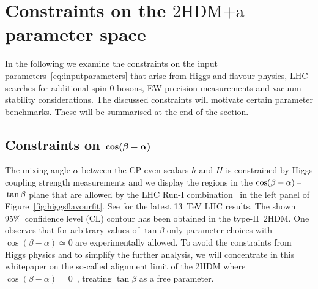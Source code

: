 \documentclass[a4paper, 11pt,notoc]{article}
\newcommand{\hdma}{\ensuremath{\textrm{2HDM+a}}\xspace}
\def\bm#1{\mbox{\boldmath$#1$\unboldmath}}
\begin{document}

\section{Constraints on the \hdma parameter space}
\label{sec:constraints}

In the following we examine the constraints on the input parameters~\eqref{eq:inputparameters} that arise from Higgs and flavour physics, LHC searches for additional spin-0 bosons, EW precision measurements and vacuum stability considerations. The discussed constraints will motivate certain parameter benchmarks. These will be summarised at the end of the section. 

\subsection*{Constraints on $\bm{\cos (\beta - \alpha)}$}

The mixing angle $\alpha$ between the CP-even scalars $h$ and $H$ is constrained by Higgs coupling strength measurements and we display the regions in the $\cos(\beta-\alpha)\hspace{0.5mm}$--$\hspace{0.5mm}\tan\beta$ plane that are allowed by the LHC Run-I combination~\cite{Khachatryan:2016vau} in  the left panel of Figure~\ref{fig:higgsflavourfit}. See \cite{ATLAS-CONF-2018-031,CMS-PAS-HIG-17-031} for the latest 13~TeV LHC results.  The shown 95\%~confidence level (CL) contour has been obtained in the type-II~2HDM. One observes that for arbitrary values of $\tan \beta$ only parameter choices with $\cos(\beta-\alpha) \simeq 0$ are experimentally allowed.  To avoid the constraints from Higgs physics and to simplify the further analysis, we will concentrate in this whitepaper on the so-called alignment limit of the 2HDM where $\cos (\beta - \alpha) = 0$~\cite{Gunion:2002zf}, treating $\tan \beta$ as a free parameter.

\end{document}
